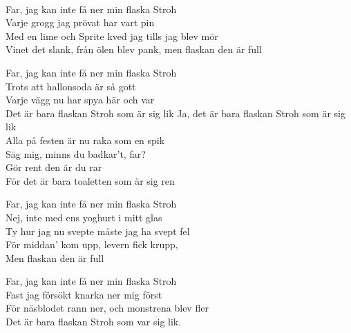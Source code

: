 

 \\       
\author{Text: Lucifer}

\songtext{}Far, jag kan inte få ner min flaska Stroh\\
Varje grogg jag prövat har vart pin \\
Med en lime och Sprite kved jag tills jag blev mör \\
Vinet det slank, från ölen blev pank, men flaskan den är full 

Far, jag kan inte få ner min flaska Stroh \\
Trots att hallonsoda är så gott\\
Varje vägg nu har spya här och var \\
Det är bara flaskan Stroh som är sig lik 
\newpage
Ja, det är bara flaskan Stroh som är sig lik \\
Alla på festen är nu raka som en spik \\
Säg mig, minns du badkar't, far? \\
Gör rent den är du rar \\
För det är bara toaletten som är sig ren 

Far, jag kan inte få ner min flaska Stroh \\
Nej, inte med ens yoghurt i mitt glas  \\
Ty hur jag nu svepte måste jag ha svept fel \\
För middan' kom upp, levern fick krupp, \\
Men flaskan den är full 

Far, jag kan inte få ner min flaska Stroh \\
Fast jag försökt knarka ner mig först \\
För näsblodet rann ner, och monstrena blev fler \\
Det är bara flaskan Stroh som var sig lik.

\\


 \\       
\author{Text: Janne Weijnitz}

